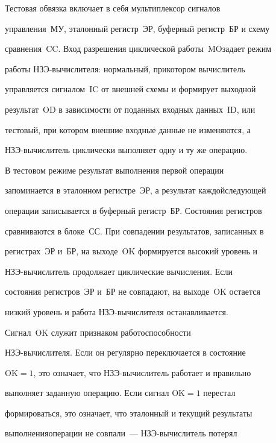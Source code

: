    Тестовая обвязка включает в себя мультиплексор сигналов


управления~МУ, эталонный регистр~ЭР, буферный регистр~БР и схему


сравнения~CC. Вход разрешения циклической работы~MO\linebreak задает режим


работы НЗЭ-вы\-чис\-ли\-те\-ля: нормальный, при\linebreak котором вычислитель


управляется сигналом~IC от внешней схе\-мы и формирует выходной


результат~OD в зависимости от поданных входных данных~ID, или


тестовый, при котором внешние входные данные не изменяются, а


   НЗЭ-вы\-чис\-ли\-тель циклически выполняет одну и ту же операцию.





   В тестовом режиме результат выполнения первой операции


запоминается в эталонном регистре~ЭР, а результат каждой\linebreak следующей


операции записывается в буферный регистр~БР. Состояния регистров


сравниваются в блоке~СС. При совпадении результатов, записанных в


регистрах~ЭР и~БР, на выходе~OK формируется высокий уровень и


   НЗЭ-вы\-чис\-ли\-тель продолжает циклические вычисления. Если


состояния регистров~ЭР и~БР не совпадают, на выходе~OK остается


низкий уровень и работа НЗЭ-вы\-чис\-ли\-те\-ля останавливается.


Сигнал~OK служит признаком работоспособности


   НЗЭ-вы\-чис\-ли\-те\-ля. Если он регулярно переключается в состояние


$\mathrm{OK}=1$, это означает, что НЗЭ-вы\-чис\-ли\-тель работает и правильно


выполняет заданную операцию. Если сигнал $\mathrm{OK}=1$ перестал


формироваться, это означает, что эталонный и текущий результаты


выполнения\linebreak операции не совпали~--- НЗЭ-вы\-чис\-ли\-тель потерял


